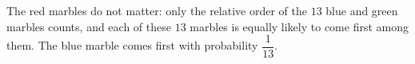 The red marbles do not matter: only the relative order of the $13$ blue and green marbles counts, and each of these $13$ marbles is equally likely to come first among them. The blue marble comes first with probability $\boxed{\dfrac{1}{13}}$.
